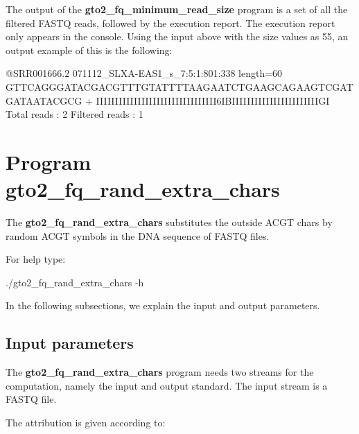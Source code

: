 \documentclass[11pt,]{krantz}
\newenvironment{Shaded}{\begin{snugshade}}{\end{snugshade}}
\newcommand{\ExtensionTok}[1]{#1}
\newcommand{\NormalTok}[1]{#1}
\begin{document}
The output of the \textbf{gto2\_fq\_minimum\_read\_size} program is a
set of all the filtered FASTQ reads, followed by the execution report.
The execution report only appears in the console. Using the input above
with the size values as 55, an output example of this is the following:

\begin{Shaded}
\begin{Highlighting}[]
\ExtensionTok{@SRR001666.2}\NormalTok{ 071112_SLXA-EAS1_s_7:5:1:801:338 length=60}
\ExtensionTok{GTTCAGGGATACGACGTTTGTATTTTAAGAATCTGAAGCAGAAGTCGATGATAATACGCG}
\ExtensionTok{+}
\ExtensionTok{IIIIIIIIIIIIIIIIIIIIIIIIIIIIIIII6IBIIIIIIIIIIIIIIIIIIIIIIIGI}
\ExtensionTok{Total}\NormalTok{ reads    : 2}
\ExtensionTok{Filtered}\NormalTok{ reads : 1}
\end{Highlighting}
\end{Shaded}

\section{Program
gto2\_fq\_rand\_extra\_chars}\label{program-gto2_fq_rand_extra_chars}

The \textbf{gto2\_fq\_rand\_extra\_chars} substitutes the outside ACGT
chars by random ACGT symbols in the DNA sequence of FASTQ files.

For help type:

\begin{Shaded}
\begin{Highlighting}[]
\ExtensionTok{./gto2_fq_rand_extra_chars}\NormalTok{ -h}
\end{Highlighting}
\end{Shaded}

In the following subsections, we explain the input and output
parameters.

\subsection*{Input parameters}\label{input-parameters-8}


The \textbf{gto2\_fq\_rand\_extra\_chars} program needs two streams for
the computation, namely the input and output standard. The input stream
is a FASTQ file.

The attribution is given according to:
\end{document}
